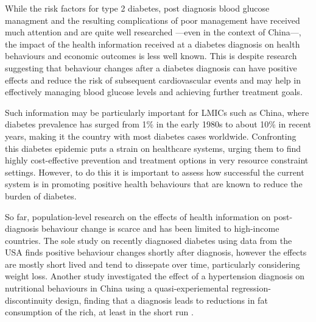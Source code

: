 While the risk factors for type 2 diabetes, post diagnosis blood glucose managment and the resulting complications of poor management have received much attention and are quite well researched ---even in the context of China\autocite{Pan2015,Batis2014,Zhao2012,Ma2014,Chan2014,Yang2012}---, the impact of the health information received at a diabetes diagnosis on health behaviours and economic outcomes is less well known. This is despite research suggesting that behaviour changes after a diabetes diagnosis can have positive effects and reduce the risk of subsequent cardiovascular events\autocite{Long2014} and may help in effectively managing blood glucose levels and achieving further treatment goals.\autocite{Zhou2016}

Such information may be particularly important for \acp{LMIC} such as China, where diabetes prevalence has surged from 1\% in the early 1980s to about 10\% in recent years, making it the country with most diabetes cases worldwide.\autocite{Hu2011,Risk2016} Confronting this diabetes epidemic puts a strain on healthcare systems, urging them to find highly cost-effective prevention and treatment options in very resource constraint settings. However, to do this it is important to assess how successful the current system is in promoting positive health behaviours that are known to reduce the burden of diabetes.

So far, population-level research on the effects of health information on post-diagnosis behaviour change is scarce and has been limited to high-income countries. The sole study on recently diagnosed diabetes using data from the \ac{USA} finds positive behaviour changes shortly after diagnosis, however the effects are mostly short lived and tend to dissepate over time, particularly considering weight loss.\autocite{Slade2012} Another study investigated the effect of a hypertension diagnosis on nutritional behaviours in China using a quasi-experiemental regression-discontinuity design, finding that a diagnosis leads to reductions in fat consumption of the rich, at least in the short run \autocite{Zhao2013a}. 


